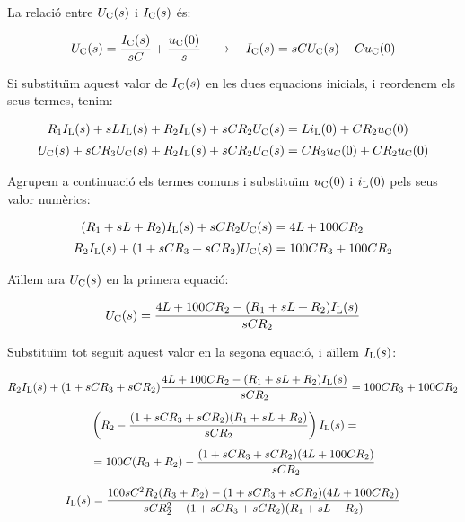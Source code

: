 \begin{exemple}
    La relaci\'{o} entre $U_\mathrm{C}(s)$ i $I_\mathrm{C}(s)$ \'{e}s:

    \begin{equation*}
        U_\mathrm{C}(s) = \frac{I_\mathrm{C}(s)}{s C} + \frac{u_\mathrm{C}(0)}{s}
        \quad\rightarrow\quad I_\mathrm{C}(s) = s C U_\mathrm{C}(s) - C u_\mathrm{C}(0)
    \end{equation*}

    Si substitu\"{\i}m aquest valor de $I_\mathrm{C}(s)$ en les dues equacions
    inicials, i reordenem els seus termes, tenim:

    \begin{align*}
        R_1 I_\mathrm{L}(s) + s L I_\mathrm{L}(s)  + R_2
        I_\mathrm{L}(s) + s C R_2 U_\mathrm{C}(s) &= L i_\mathrm{L}(0) + C R_2 u_\mathrm{C}(0)\\[0.5ex]
        U_\mathrm{C}(s) + s C R_3 U_\mathrm{C}(s) + R_2 I_\mathrm{L}(s) + s C R_2 U_\mathrm{C}(s)
        &= C R_3 u_\mathrm{C}(0) + C R_2 u_\mathrm{C}(0)
    \end{align*}

    Agrupem a continuaci\'{o} els termes comuns i substitu\"{\i}m $u_\mathrm{C}(0)$ i
    $i_\mathrm{L}(0)$ pels seus valor num\`{e}rics:

    \begin{align*}
        (R_1 + s L + R_2) I_\mathrm{L}(s) + s C R_2 U_\mathrm{C}(s) &= 4 L  + 100 C R_2\\[0.5ex]
        R_2 I_\mathrm{L}(s) + (1 +s C R_3 + s C R_2) U_\mathrm{C}(s) &= 100 C R_3  + 100 C R_2
    \end{align*}

    A\"{\i}llem ara $U_\mathrm{C}(s)$ en la primera equaci\'{o}:

    \[
        U_\mathrm{C}(s) = \frac{4 L  + 100 C R_2 -(R_1 + s L + R_2) I_\mathrm{L}(s)}{s C R_2}
    \]

    Substitu\"{\i}m tot seguit aquest valor en la segona equaci\'{o}, i a\"{\i}llem
    $I_\mathrm{L}(s)$:

    \begin{gather*}
       R_2 I_\mathrm{L}(s) + (1 + s C R_3 + s C R_2) \frac{4 L  + 100 C R_2 - (R_1 + s L + R_2)I_\mathrm{L}(s)}{s C R_2} = 100 C R_3  + 100 C R_2 \\[1.5ex]
       \begin{split} &\left( R_2 - \frac{(1 +s C R_3 + s C R_2)(R_1 + s L + R_2)}{s C R_2} \right) I_\mathrm{L}(s)
       = \\[1ex] &= 100 C (R_3  + R_2) - \frac{(1 +s C R_3 + s C R_2)(4 L  + 100 C R_2)}{s C
       R_2}\end{split}\\[1.5ex]
    I_\mathrm{L}(s) = \frac{100 s C^2 R_2(R_3  + R_2)- (1 +s C R_3 + s C
    R_2)(4 L  + 100 C R_2)}{s C R_2^2  -(1 +s C R_3 + s C R_2)(R_1 + s L
    + R_2)}
    \end{gather*}


\end{exemple}
